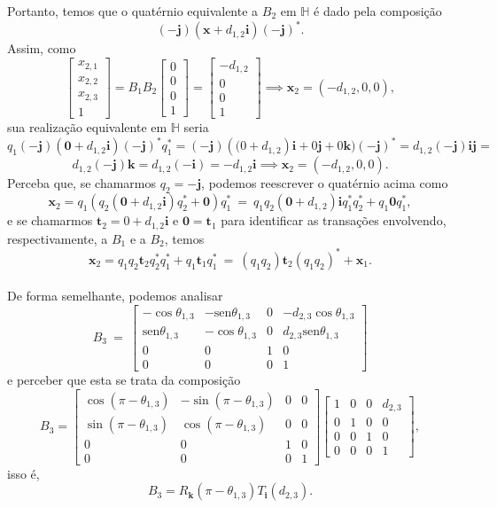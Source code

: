 \documentclass[a4paper,12pt]{report}
\theoremstyle{plain}
\theoremstyle{definition}
\begin{document}
	Portanto, temos que o quatérnio equivalente a $B_2$ em $\mathbb{H}$ é dado pela composição 
	$$(-\mathbf j)(\mathbf x+d_{1,2}\mathbf i)(-\mathbf j)^*.$$
	Assim, como 
	$$
	\begin{bmatrix}
		x_{2,1}\\ 
		x_{2,2}\\ 
		x_{2,3}\\ 
		1
	\end{bmatrix}
	= B_{1}B_2\begin{bmatrix}
		0\\ 
		0\\ 
		0\\ 
		1
	\end{bmatrix} = 
	\begin{bmatrix}
		-d_{1,2}\\ 
		0\\ 
		0\\ 
		1
	\end{bmatrix} \implies \mathbf x_2 = (-d_{1,2},0,0),
	$$
	sua realização equivalente em $\mathbb{H}$ seria
	$$q_1(-\mathbf j)(\mathbf 0+d_{1,2}\mathbf i)(-\mathbf j)^*q_1^* = (-\mathbf j)(\mathbf (0+d_{1,2})\mathbf i + 0 \mathbf j + 0 \mathbf k)(-\mathbf j)^* = d_{1,2}(-\mathbf j)\mathbf i\mathbf j = $$$$ d_{1,2}(-\mathbf j)\mathbf k= d_{1,2}(-\mathbf i) = -d_{1,2}\mathbf i \implies \mathbf x_2 = (-d_{1,2}, 0, 0).$$
	Perceba que, se chamarmos $q_2 = -\mathbf j$, podemos reescrever o quatérnio acima como $$\mathbf x_2 = q_1(q_2(\mathbf 0 + d_{1,2}\mathbf i)q_2^* + \mathbf 0)q_1^* \ =\  q_1q_2(\mathbf 0 + d_{1,2})\mathbf iq_1^*q_2^* + q_1\mathbf 0q_1^*,$$ e se chamarmos $\mathbf t_2 = 0+d_{1,2}\mathbf i$ e $\mathbf 0 = \mathbf t_1$ para identificar as transações envolvendo, respectivamente, a $B_1$ e a $B_2$, temos $$\mathbf x_2 = q_1q_2\mathbf t_2q_2^*q_1^* + q_1\mathbf t_1q_1^* \ = \ (q_1q_2)\mathbf t_2 (q_1q_2)^* + \mathbf x_1.$$
	\\
	
	De forma semelhante, podemos analisar 
	$$
	B_3\:=\:
	\begin{bmatrix}
		-\cos\theta_{1,3} & -\mbox{sen}\theta_{1,3} & 0 & -d_{2,3}\cos\theta_{1,3}\\ 
		\mbox{sen}\theta_{1,3} & -\cos\theta_{1,3} & 0 & d_{2,3}\mbox{sen}\theta_{1,3}\\ 
		0 & 0 & 1 & 0\\ 
		0 & 0 & 0 & 1
	\end{bmatrix}
	$$
	e perceber que esta se trata da composição 
	$$B_3 =
	\begin{bmatrix}
		\cos(\pi-\theta_{1,3}) & -\sin(\pi-\theta_{1,3}) & 0 &0\\ 
		\sin(\pi-\theta_{1,3}) & \cos(\pi-\theta_{1,3})  & 0 &0\\ 
		0       &          0       & 1&0\\
		0 & 0& 0& 1
	\end{bmatrix}
	\begin{bmatrix}
		1&0 & 0& d_{2,3}\\
		0 & 1 & 0& 0\\
		0 & 0&1& 0\\
		0 & 0& 0& 1
	\end{bmatrix}
	,$$ isso é,
	 $$B_3 = R_{\mathbf k}(\pi-\theta_{1,3})T_{\mathbf i}(d_{2,3}).$$
	
\end{document}
